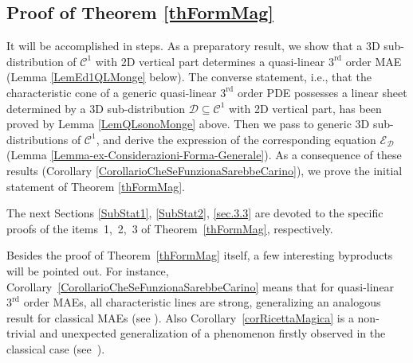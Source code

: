 \documentclass[10pt,a4paper]{amsart}
\newcommand{\C}{\mathcal{C}}
\newcommand{\D}{\mathcal{D}}
\newcommand{\E}{\mathcal{E}}
\newcommand{\Rd}{^\textrm{rd}}
\numberwithin{equation}{section}
\begin{document}
\subsection{Proof of Theorem \ref{thFormMag}}
It will be accomplished in steps. As a preparatory result, we show that a 3D sub-distribution of $\C^1$ with 2D vertical part determines a quasi-linear $3\Rd$ order MAE (Lemma \ref{LemEd1QLMonge} below). The converse statement, i.e., that the characteristic cone of a generic quasi-linear $3\Rd$ order PDE possesses a linear sheet determined by a 3D sub-distribution $\D\subseteq \C^1$ with 2D vertical part, has been proved by Lemma \ref{LemQLsonoMonge} above. Then we pass to generic 3D sub-distributions of $\C^1$, and derive the expression of the corresponding equation $\E_\D$ (Lemma \ref{Lemma-ex-Considerazioni-Forma-Generale}). As a consequence of these results (Corollary \ref{CorollarioCheSeFunzionaSarebbeCarino}), we prove the initial statement of Theorem \ref{thFormMag}.

The next Sections \ref{SubStat1}, \ref{SubStat2}, \ref{sec.3.3} are devoted to the specif\/ic proofs of the items~1,~2,~3 of Theorem~\ref{thFormMag}, respectively.

Besides the proof of Theorem~\ref{thFormMag} itself, a few interesting byproducts will be pointed out. For instance, Corollary~\ref{CorollarioCheSeFunzionaSarebbeCarino} means that for quasi-linear~$3\Rd$ order MAEs, all characteristic lines are strong, generalizing an analogous result for classical MAEs (see \cite[Theorem~3.7]{MR2985508}). Also Corollary~\ref{corRicettaMagica} is a non-trivial and unexpected generalization of a phenomenon f\/irstly observed in the classical case (see~\cite[Theorem~1.1]{MR2985508}).
\end{document}
